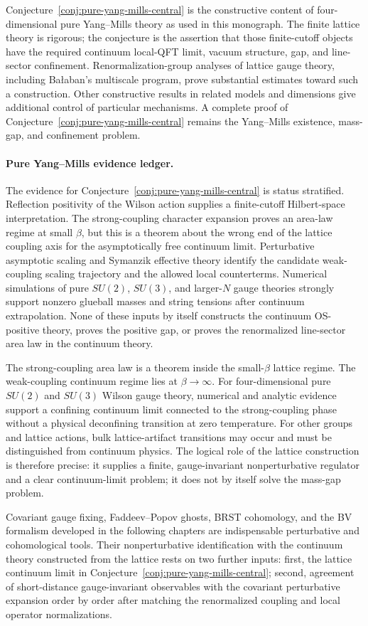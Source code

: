 Conjecture~\ref{conj:pure-yang-mills-central} is the constructive content of
four-dimensional pure Yang--Mills theory as used in this monograph.  The finite
lattice theory is rigorous; the conjecture is the assertion that those
finite-cutoff objects have the required continuum local-QFT limit, vacuum
structure, gap, and line-sector confinement.  Renormalization-group analyses of
lattice gauge theory, including Ba{\l}aban's multiscale program, prove
substantial estimates toward such a construction.  Other constructive results
in related models and dimensions give additional control of particular
mechanisms.  A complete proof of
Conjecture~\ref{conj:pure-yang-mills-central} remains the Yang--Mills existence,
mass-gap, and confinement problem.

\paragraph{Pure Yang--Mills evidence ledger.}
The evidence for Conjecture~\ref{conj:pure-yang-mills-central} is status
stratified.  Reflection positivity of the Wilson action supplies a finite-cutoff
Hilbert-space interpretation.  The strong-coupling character expansion proves an
area-law regime at small \(\beta\), but this is a theorem about the wrong end of
the lattice coupling axis for the asymptotically free continuum limit.
Perturbative asymptotic scaling and Symanzik effective theory identify the
candidate weak-coupling scaling trajectory and the allowed local counterterms.
Numerical simulations of pure \(SU(2)\), \(SU(3)\), and larger-\(N\) gauge
theories strongly support nonzero glueball masses and string tensions after
continuum extrapolation.  None of these inputs by itself constructs the
continuum OS-positive theory, proves the positive gap, or proves the
renormalized line-sector area law in the continuum theory.

The strong-coupling area law is a theorem inside the small-\(\beta\) lattice
regime.  The weak-coupling continuum regime lies at \(\beta\to\infty\).  For
four-dimensional pure \(SU(2)\) and \(SU(3)\) Wilson gauge theory, numerical
and analytic evidence support a confining continuum limit connected to the
strong-coupling phase without a physical deconfining transition at zero
temperature.  For other groups and lattice actions, bulk lattice-artifact
transitions may occur and must be distinguished from continuum physics.  The
logical role of the lattice construction is therefore precise: it supplies a
finite, gauge-invariant nonperturbative regulator and a clear continuum-limit
problem; it does not by itself solve the mass-gap problem.

Covariant gauge fixing, Faddeev--Popov ghosts, BRST cohomology, and the BV
formalism developed in the following chapters are indispensable perturbative
and cohomological tools.  Their nonperturbative identification with the
continuum theory constructed from the lattice rests on two further inputs:
first, the lattice continuum limit in
Conjecture~\ref{conj:pure-yang-mills-central}; second, agreement of
short-distance gauge-invariant observables with the covariant perturbative
expansion order by order after matching the renormalized coupling and local
operator normalizations.
